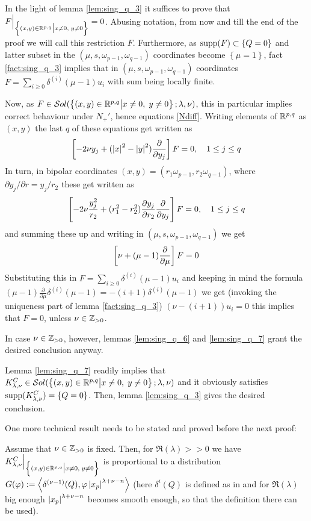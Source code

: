 \documentclass[10pt]{article} %
\theoremstyle{definition}
\theoremstyle{remark}
\begin{document}
\begin{myproof}
	In the light of lemma \ref{lem:sing_q_3} it suffices to prove that $F\Big|_{\mysetn{(x,y)\in\R^{p,q}}{x\neq0,\;y\neq0}}=0$.
	Abusing notation, from now and till the end of the proof we will call this restriction $F$.
	Furthermore, as $\supp(F)\subset\left\{ Q=0 \right\}$ and latter subset in the $(\mu,s,\omega_{p-1},\omega_{q-1})$ coordinates
	become $\left\{ \mu=1 \right\}$, fact \ref{fact:sing_q_3}
	implies that in $(\mu,s,\omega_{p-1},\omega_{q-1})$ coordinates 
	$F=\sum_{i\geq0}\delta^{(i)}(\mu-1)u_i$ with sum being locally finite.

	Now, as $F\in\sol[\mysetn{(x,y)\in\R^{p,q}}{x\neq0,\;y\neq0}]$, this in particular
	implies correct behaviour under $N_+'$, hence equations \eqref{Ndiff}. Writing elements of $\R^{p,q}$
	as $(x,y)$ the last $q$ of these equations get written as \[\left[ -2\nu y_j+(\myabs{x}^2-\myabs{y}^2)\frac{\partial}{
	\partial y_j} \right]F=0,\quad1\leq j\leq q\]
	In turn, in bipolar coordinates $(x,y)=(r_1\omega_{p-1},r_2\omega_{q-1})$, where $\partial y_j/\partial r=
	y_j/r_2$ these get written as
	\[\mysbra{-2\nu \frac{y_j^2}{r_2}+(r_1^2-r_2^2)\frac{\partial y_j}{\partial r_2}\frac{\partial}{\partial y_j}}F=0,\quad
	1\leq j\leq q\]
	and summing these up and writing in $(\mu,s,\omega_{p-1},\omega_{q-1})$ we get
	\[\mysbra{\nu+(\mu-1)\frac{\partial}{\partial\mu}}F=0\]
	Substituting this in 
	$F=\sum_{i\geq0}\delta^{(i)}(\mu-1)u_i$ and keeping in mind the formula $(\mu-1)\frac{\partial}{\partial\mu}\delta^{(i)}
	(\mu-1)=-(i+1)\delta^{(i)}(\mu-1)$ we get (invoking the uniqueness part of lemma \ref{fact:sing_q_3})
	$(\nu-(i+1))u_i=0$ this implies that $F=0$, unless $\nu\in\Z_{>0}$.

	In case $\nu\in\Z_{>0}$, however, lemmas \ref{lem:sing_q_6} and \ref{lem:sing_q_7} grant the desired conclusion anyway.
\end{myproof}
\begin{myproof}
	Lemma \ref{lem:sing_q_7} readily implies that $K^C_{\lambda,\nu}\in\sol[\Upp]$
	and it obviously satisfies $\supp(K^C_{\lambda,\nu})=\left\{ Q=0 \right\}$.
	Then, lemma \ref{lem:sing_q_3} gives the desired conclusion.
\end{myproof}
One more technical result needs to be stated and proved before the next proof:
\begin{mylem}
	\label{lem:sing_q_8}
	Assume that $\nu\in\Z_{>0}$ is fixed. Then, for $\Re(\lambda)>>0$ we have
	$K_{\lambda,\nu}^C\Big|_{\Upp}$ is proportional to a distribution
	$G(\varphi):=\myabra{\delta^{(\nu-1)}(Q),\varphi\myabs{x_p}^{\lambda+\nu-n}}$
	(here $\delta^{i}(Q)$ is defined as in
	\cite[ch. III, sec. 2.1]{gelfand1980distribution} and for $\Re(\lambda)$ big enough $\myabs{x_p}^{\lambda+\nu-n}$ becomes
	smooth enough, so that the definition there can be used).
\end{mylem}
\end{document}

